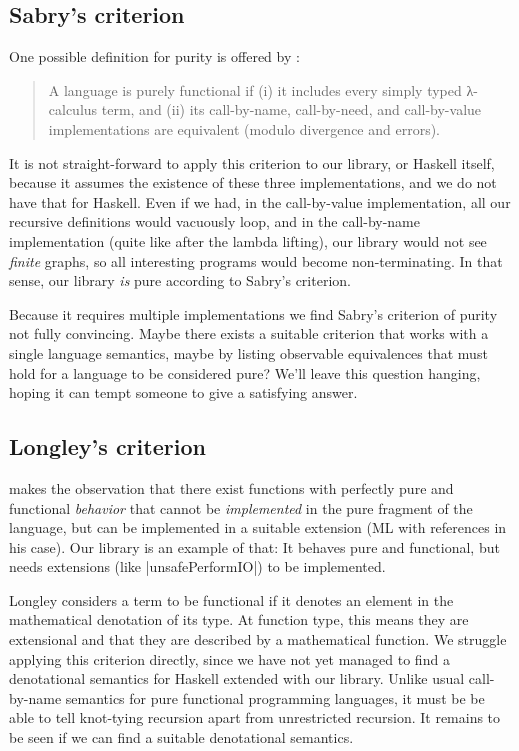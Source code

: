 \documentclass[manuscript,review,screen,acmsmall]{acmart}
\begin{document}
\subsection{Sabry's criterion}

One possible definition for purity is offered by \citet{sabry}:
\begin{quote}
A language is purely functional if (i) it includes every simply typed λ-calculus term, and
(ii) its call-by-name, call-by-need, and call-by-value implementations are equivalent (modulo
divergence and errors).
\end{quote}

It is not straight-forward to apply this criterion to our library, or Haskell itself, because it assumes the existence of these three implementations, and we do not have that for Haskell. Even if we had, in the call-by-value implementation, all our recursive definitions would vacuously loop, and in the call-by-name implementation (quite like after the lambda lifting), our library would not see \emph{finite} graphs, so all interesting programs would become non-terminating. In that sense, our library \emph{is} pure according to Sabry’s criterion.

Because it requires multiple implementations we find Sabry’s criterion of purity not fully convincing. Maybe there exists a suitable criterion that works with a single language semantics, maybe by listing observable equivalences that must hold for a language to be considered pure?
We'll leave this question hanging, hoping it can tempt someone to give a satisfying answer.

\subsection{Longley’s criterion}

 makes the observation that there exist functions with perfectly pure and functional \emph{behavior} that cannot be \emph{implemented} in the pure fragment of the language, but can be implemented in a suitable extension (ML with references in his case). Our library is an example of that: It behaves pure and functional, but needs extensions (like |unsafePerformIO|) to be implemented.

Longley considers a term to be functional if it denotes an element in the mathematical denotation of its type. At function type, this means they are extensional and that they are described by a mathematical function. We struggle applying this criterion directly, since we have not yet managed to find a denotational semantics for Haskell extended with our library. Unlike usual call-by-name semantics for pure functional programming languages, it must be be able to tell knot-tying recursion apart from unrestricted recursion. It remains to be seen if we can find a suitable denotational semantics.
\end{document}
